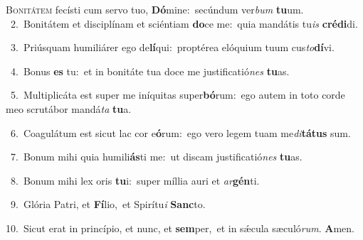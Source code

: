 \lettrine{\initial\textcolor{\initialcolor}{B}}{onitátem} fecísti cum servo tuo, \textbf{Dó}\-mine:~\star secúndum ver\textit{bum} \textbf{tu}\-um.\\
{\numbfont\textcolor{\numbcolor}{~2.}}~Bonitátem et disciplínam et sciéntiam \textbf{do}\-ce me:~\star quia mandátis tu\textit{is} \textbf{cré}\-\textbf{di}di.\par
{\numbfont\textcolor{\numbcolor}{~3.}}~Priúsquam humiliárer ego de\-\textbf{lí}\-qui:~\star proptérea elóquium tuum cus\-\textit{to}\-\textbf{dí}vi.\par
{\numbfont\textcolor{\numbcolor}{~4.}}~Bonus \textbf{es} tu:~\star et in bonitáte tua doce me justificatió\textit{nes} \textbf{tu}\-as.\par
{\numbfont\textcolor{\numbcolor}{~5.}}~Multiplicáta est super me iníquitas super\-\textbf{bó}\-rum:~\star ego autem in toto corde meo scrutábor mandá\textit{ta} \textbf{tu}\-a.\par
{\numbfont\textcolor{\numbcolor}{~6.}}~Coagulátum est sicut lac cor e\-\textbf{ó}\-rum:~\star ego vero legem tuam me\-\textit{di}\-\textbf{tá}\textbf{tus} sum.\par
{\numbfont\textcolor{\numbcolor}{~7.}}~Bonum mihi quia humili\-\textbf{ás}\-ti me:~\star ut discam justificatió\textit{nes} \textbf{tu}\-as.\par
{\numbfont\textcolor{\numbcolor}{~8.}}~Bonum mihi lex oris \textbf{tu}\-i:~\star super míllia auri et \textit{ar}\-\textbf{gén}ti.\par
{\numbfont\textcolor{\numbcolor}{~9.}}~Glória Patri, et \textbf{Fí}\-lio,~\star et Spirítu\textit{i} \textbf{Sanc}\-to.\par
{\numbfont\textcolor{\numbcolor}{10.}}~Sicut erat in princípio, et nunc, et \textbf{sem}\-per,~\star et in sǽcula sæculó\-\textit{rum}\-. \textbf{A}\-men.\par
